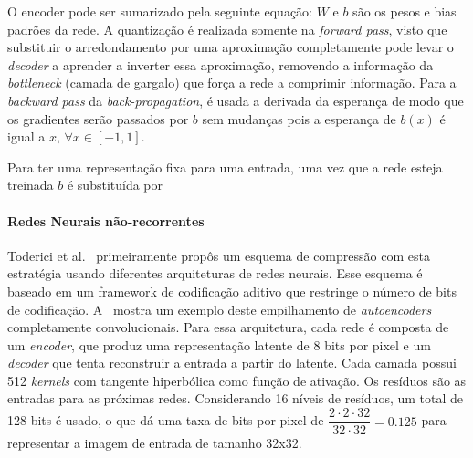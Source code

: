 O encoder pode ser sumarizado pela seguinte equação: $W$ e $b$ são os pesos e bias padrões da rede. A quantização é realizada somente na \textit{forward pass}, visto que substituir o arredondamento por uma aproximação completamente pode levar o \textit{decoder} a aprender a inverter essa aproximação, removendo a informação da \textit{bottleneck} (camada de gargalo) que força a rede a comprimir informação. Para a \textit{backward pass} da \textit{back-propagation}, é usada a derivada da esperança de modo que os gradientes serão passados por $b$ sem mudanças pois a esperança de $b(x)$ é igual a $x, \, \forall x \in [-1, 1]$. 

Para ter uma representação fixa para uma entrada, uma vez que a rede esteja treinada $b$ é substituída por 
\paragraph{Redes Neurais não-recorrentes\\}

Toderici et al.~\cite{Variable2016Toderici} primeiramente propôs um esquema de compressão com esta estratégia usando diferentes arquiteturas de redes neurais. Esse esquema é baseado em um framework de codificação aditivo que restringe o número de bits de codificação. A~ mostra um exemplo deste empilhamento de \textit{autoencoders} completamente convolucionais. Para essa arquitetura, cada rede é composta de um \textit{encoder}, que produz uma representação latente de 8 bits por pixel e um \textit{decoder} que tenta reconstruir a entrada a partir do latente. Cada camada possui 512 \textit{kernels} com tangente hiperbólica como função de ativação. Os resíduos são as entradas para as próximas redes. Considerando 16 níveis de resíduos, um total de 128 bits é usado, o que dá uma taxa de bits por pixel de $\dfrac{2 \cdot 2 \cdot 32}{32 \cdot 32} = 0.125$ para representar a imagem de entrada de tamanho 32x32. 


